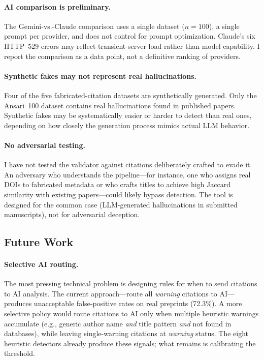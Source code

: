 \paragraph{AI comparison is preliminary.} The Gemini-vs.-Claude comparison uses a single dataset ($n=100$), a single prompt per provider, and does not control for prompt optimization. Claude's six HTTP~529 errors may reflect transient server load rather than model capability. I report the comparison as a data point, not a definitive ranking of providers.

\paragraph{Synthetic fakes may not represent real hallucinations.} Four of the five fabricated-citation datasets are synthetically generated. Only the Ansari~100 dataset contains real hallucinations found in published papers. Synthetic fakes may be systematically easier or harder to detect than real ones, depending on how closely the generation process mimics actual LLM behavior.

\paragraph{No adversarial testing.} I have not tested the validator against citations deliberately crafted to evade it. An adversary who understands the pipeline---for instance, one who assigns real DOIs to fabricated metadata or who crafts titles to achieve high Jaccard similarity with existing papers---could likely bypass detection. The tool is designed for the common case (LLM-generated hallucinations in submitted manuscripts), not for adversarial deception.

\subsection{Future Work}

\paragraph{Selective AI routing.} The most pressing technical problem is designing rules for when to send citations to AI analysis. The current approach---route all \textit{warning} citations to AI---produces unacceptable false-positive rates on real preprints (72.3\%). A more selective policy would route citations to AI only when multiple heuristic warnings accumulate (e.g., generic author name \emph{and} title pattern \emph{and} not found in databases), while leaving single-warning citations at \textit{warning} status. The eight heuristic detectors already produce these signals; what remains is calibrating the threshold.

